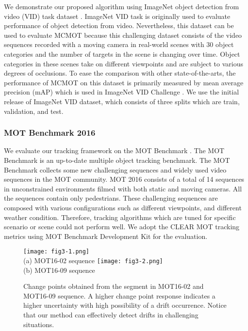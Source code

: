 \documentclass[runningheads]{llncs}
\begin{document}
We demonstrate our proposed algorithm using ImageNet object detection from video (VID) task dataset \cite{Ref31}. ImageNet VID task is originally used to evaluate performance of object detection from video. Nevertheless, this dataset can be used to evaluate MCMOT because this challenging dataset consists of the video sequences recorded with a moving camera in real-world scenes with 30 object categories and the number of targets in the scene is changing over time. Object categories in these scenes take on different viewpoints and are subject to various degrees of occlusions. To ease the comparison with other state-of-the-arts, the performance of MCMOT on this dataset is primarily measured by mean average precision (mAP) which is used in ImageNet VID Challenge \cite{Ref31}. We use the initial release of ImageNet VID dataset, which consists of three splits which are train, validation, and test.

\subsubsection{MOT Benchmark 2016}

We evaluate our tracking framework on the MOT Benchmark \cite{Ref32}. The MOT Benchmark is an up-to-date multiple object tracking benchmark. The MOT Benchmark collects some new challenging sequences and widely used video sequences in the MOT community. MOT 2016 consists of a total of 14 sequences in unconstrained environments filmed with both static and moving cameras. All the sequences contain only pedestrians. These challenging sequences are composed with various configurations such as different viewpoints, and different weather condition. Therefore, tracking algorithms which are tuned for specific scenario or scene could not perform well. We adopt the CLEAR MOT tracking metrics \cite{Ref23} using MOT Benchmark Development Kit \cite{Ref32} for the evaluation.

\begin{figure}[t!]
\centering
\texttt{[image: fig3-1.png]} \\
(a) MOT16-02 sequence
\texttt{[image: fig3-2.png]} \\
(b) MOT16-09 sequence
\caption{Change points obtained from the segment in MOT16-02 and MOT16-09 sequence. A higher change point response indicates a higher uncertainty with high possibility of a drift occurrence. Notice that our method can effectively detect drifts in challenging situations.}
\label{fig:3}
\end{figure}
\end{document}
